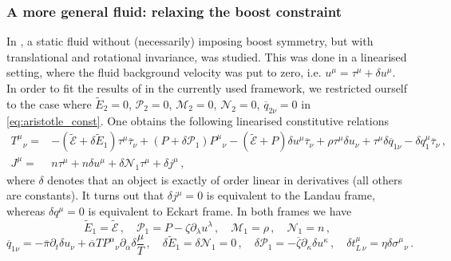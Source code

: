 \documentclass[superscriptaddress,prd,nofootinbib,preprintnumbers,longbibliography,11pt,eqsecnum]{revtex4-1}
\begin{document}
\subsubsection{A more general fluid: relaxing the boost constraint}\label{sec:general}
In \cite{deBoer:2017abi}, a static fluid without (necessarily) imposing boost symmetry, but with translational and rotational invariance, was studied. This was done in a linearised setting, where the fluid background velocity was put to zero, i.e. $u^{\mu}=\tau^{\mu}+\delta u^{\mu}$. In order to fit the results of \cite{deBoer:2017abi} in the currently used framework, we restricted ourself to the case where $\tilde{E}_{2}=0$, $\mathcal{P}_{2}=0$, $\mathcal{M}_{2}=0$, $\mathcal{N}_{2}=0$, $\overline{q}_{2\nu}=0$ in \eqref{eq:aristotle_const}. One obtains the following linearised constitutive relations
\begin{equation}\begin{aligned}\label{eq:emt_gen_2}
	T^{\mu}_{\;\;\,\nu}
	=&
	-
	\left(
		\tilde{\mathcal{E}}+\delta \tilde{E}_{1}
	\right)\tau^{\mu}\overline{\tau}_{\nu}
	+
	\left(
		P+\delta\mathcal{P}_{1}
	\right)P^{\mu}_{\;\;\,\nu}
	-
	\left(
		\tilde{\mathcal{E}}
		+
		P
	\right)\delta u^{\mu}\overline{\tau}_{\nu}
	+
	\rho \tau^{\mu}\delta u_{\nu}
	+
	\tau^{\mu}
	\delta\overline{q}_{1\nu}
	-
	\delta q^{\mu}_{1}\overline{\tau}_{\nu}
	\,,
	\\
	J^{\mu}
	=&
	n\tau^{\mu}
	+
	n\delta u^{\mu}
	+
	\delta \mathcal{N}_{1}\tau^{\mu}
	+
	\delta j^{\mu}
	\,,
\end{aligned}\end{equation}
where $\delta$ denotes that an object is exactly of order linear in derivatives (all others are constants). It turns out that $\delta j^{\mu}=0$ is equivalent to the Landau frame, whereas $\delta q^{\mu}=0$ is equivalent to Eckart frame. In both frames we have
\begin{equation}
	\tilde{E}_{1}
	=
	\tilde{\mathcal{E}}
	\,,
	\quad
	\mathcal{P}_{1}
	=
	P-\zeta\partial_{\lambda}u^{\lambda}
	\,,
	\quad
	\mathcal{M}_{1}
	=
	\rho
	\,,
	\quad
	\mathcal{N}_{1}
	=
	n
	\,,
\end{equation}
\begin{equation}
	\overline{q}_{1\nu}=-\overline{\pi}\partial_{t}\delta u_{\nu}+\overline{\alpha}T
 P^{\alpha}_{\;\;\,\nu}\partial_{\alpha}\delta\frac{\mu}{T}
	\,,
	\quad
	\delta\tilde{E}_{1}=\delta \mathcal{N}_{1}=0
	\,,
	\quad
	\delta\mathcal{P}_{1}=-\overline{\zeta}\partial_{\kappa}\delta u^{\kappa}
	\,,
	\quad
	\delta t^{\mu}_{L\,\nu}=\eta \delta \sigma^{\mu}_{\;\;\,\nu}	
	\,.
\end{equation}
\end{document}
